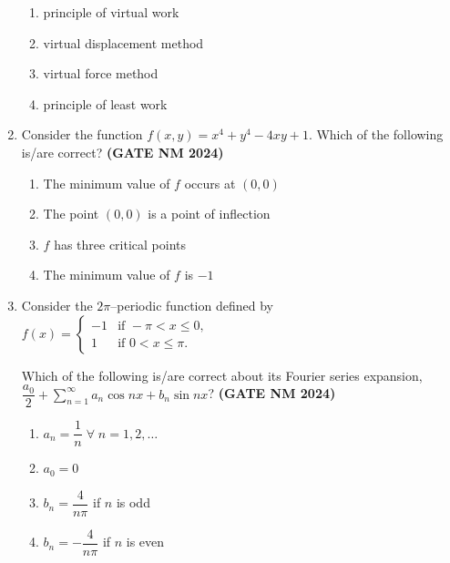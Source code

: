 \documentclass[journal,15pt,onecolumn]{IEEEtran}
\theoremstyle{remark}
\begin{document}
\begin{enumerate}
  \begin{enumerate}
    \item principle of virtual work
    \item virtual displacement method
    \item virtual force method
    \item principle of least work
  \end{enumerate}

  \item
  Consider the function $f(x,y)=x^{4}+y^{4}-4xy+1$. Which of the following is/are correct?\hfill \textbf{ (GATE NM 2024)}
  
  \begin{enumerate}
    \item The minimum value of $f$ occurs at $(0,0)$
    \item The point $(0,0)$ is a point of inflection
    \item $f$ has three critical points
    \item The minimum value of $f$ is $-1$
  \end{enumerate}

\item
Consider the $2\pi$–periodic function defined by
  $
    f(x)=
    \begin{cases}
      -1 & \text{if } -\pi < x \le 0,\\[4pt]
       1 & \text{if } 0 < x \le \pi.
    \end{cases}
  $
  
  Which of the following is/are correct about its Fourier series expansion,
  $\dfrac{a_0}{2}+\sum_{n=1}^{\infty}a_n\cos nx + b_n\sin nx$?\hfill \textbf{ (GATE NM 2024)}
  
  \begin{enumerate}
    \item $a_n=\dfrac{1}{n}\;\forall\; n=1,2,\ldots$
    \item $a_0=0$
    \item $b_n=\dfrac{4}{n\pi}$ if $n$ is odd
    \item $b_n=-\dfrac{4}{n\pi}$ if $n$ is even
  \end{enumerate}





\end{enumerate}
\end{document}
